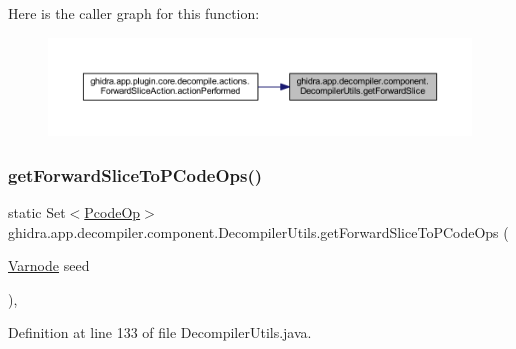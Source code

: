 Here is the caller graph for this function\+:
\nopagebreak
\begin{figure}[H]
\begin{center}
\leavevmode
\includegraphics[width=350pt]{classghidra_1_1app_1_1decompiler_1_1component_1_1_decompiler_utils_a95f384c1cd6328bcad6555a80a886790_icgraph}
\end{center}
\end{figure}
\mbox{\label{classghidra_1_1app_1_1decompiler_1_1component_1_1_decompiler_utils_a8d0973ddd8181bb7afe7a696f91bd116}} 
\subsubsection{\texorpdfstring{getForwardSliceToPCodeOps()}{getForwardSliceToPCodeOps()}}
{\footnotesize\ttfamily static Set$<$\mbox{\hyperlink{class_pcode_op}{Pcode\+Op}}$>$ ghidra.\+app.\+decompiler.\+component.\+Decompiler\+Utils.\+get\+Forward\+Slice\+To\+P\+Code\+Ops (\begin{DoxyParamCaption}\item[{\mbox{\hyperlink{class_varnode}{Varnode}}}]{seed }\end{DoxyParamCaption})\hspace{0.3cm}{\ttfamily [inline]}, {\ttfamily [static]}}



Definition at line 133 of file Decompiler\+Utils.\+java.

